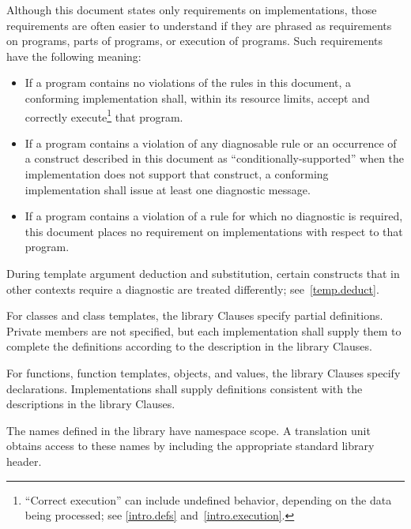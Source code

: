 \pnum
{}%
Although this document states only requirements on \Cpp
implementations, those requirements are often easier to understand if
they are phrased as requirements on programs, parts of programs, or
execution of programs. Such requirements have the following meaning:
\begin{itemize}
\item
If a program contains no violations of the rules in this
document, a conforming implementation shall,
within its resource limits, accept and correctly execute\footnote{``Correct execution'' can include undefined behavior, depending on
the data being processed; see \ref{intro.defs} and~\ref{intro.execution}.}
that program.
\item
{}%
If a program contains a violation of any diagnosable rule or an occurrence
of a construct described in this document as ``conditionally-supported'' when
the implementation does not support that construct, a conforming implementation
shall issue at least one diagnostic message.
\item
{}%
If a program contains a violation of a rule for which no diagnostic
is required, this document places no requirement on
implementations with respect to that program.
\end{itemize}
\begin{note}
During template argument deduction and substitution,
certain constructs that in other contexts require a diagnostic
are treated differently;
see~\ref{temp.deduct}.
\end{note}

\pnum
{}%
%
%
For classes and class templates, the library Clauses specify partial
definitions. Private members are not
specified, but each implementation shall supply them to complete the
definitions according to the description in the library Clauses.

\pnum
For functions, function templates, objects, and values, the library
Clauses specify declarations. Implementations shall supply definitions
consistent with the descriptions in the library Clauses.

\pnum
The names defined in the library have namespace
scope. A \Cpp  translation
unit obtains access to these names by including the
appropriate standard library header.

